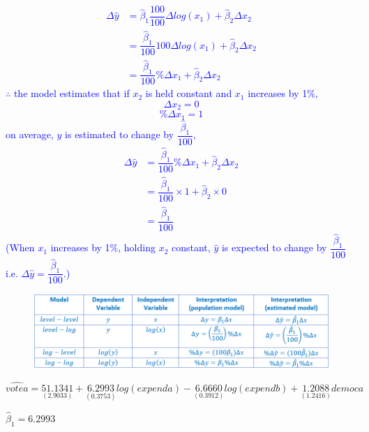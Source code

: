 \documentclass[12pt]{report}
\newenvironment{blueframed}[1][blue]
{\def\FrameCommand{\fboxsep=\FrameSep\fcolorbox{#1}{white}}%
	\MakeFramed {\advance\hsize-\width \FrameRestore}}
{\endMakeFramed}
\begin{document}
\justify
\begin{blueframed}
	\vspace{-\baselineskip}
	\justify
	\noindent \textcolor{blue}
	{
		\begin{align*}
			\Delta \hat{y} &= \hat{\beta}_1\dfrac{100}{100}\Delta log(x_1) + \hat{\beta}_2\Delta x_2 \\
			&= \dfrac{\hat{\beta}_1}{100} 100\Delta log(x_1) + \hat{\beta}_2\Delta x_2 \\
			&= \dfrac{\hat{\beta}_1}{100} \%\Delta x_1 + \hat{\beta}_2\Delta x_2
		\end{align*}
		$\therefore$ the model estimates that if $x_2$ is held constant and $x_1$ increases by 1\%, $$\Delta x_2 = 0$$ $$\% \Delta x_1 = 1$$ on average, $y$ is estimated to change by $\dfrac{\hat{\beta}_1}{100}$, \begin{align*}
			\Delta \hat{y} &= \dfrac{\hat{\beta}_1}{100} \%\Delta x_1 + \hat{\beta}_2\Delta x_2 \\
			&= \dfrac{\hat{\beta}_1}{100} \times 1 + \hat{\beta}_2 \times 0 \\
			&= \dfrac{\hat{\beta}_1}{100}
		\end{align*} (When $x_1$ increases by 1\%, holding $x_2$ constant, $\hat{y}$ is expected to change by $\dfrac{\hat{\beta}_1}{100}$ i.e. $\Delta\hat{y} = \dfrac{\hat{\beta}_1}{100}$.)
	}
\end{blueframed}
\begin{figure}[H]
	\centerline{\includegraphics{tute7_q1_1}}
\end{figure}
\vspace{-\baselineskip}

\newpage
$$\widehat{votea} = \underset{(2.9033)}{51.1341} + \underset{(0.3753)}{6.2993}log(expenda) - \underset{(0.3912)}{6.6660}log(expendb) + \underset{(1.2416)}{1.2088}democa$$

\noindent $\hat{\beta}_1 = 6.2993$
\end{document}
